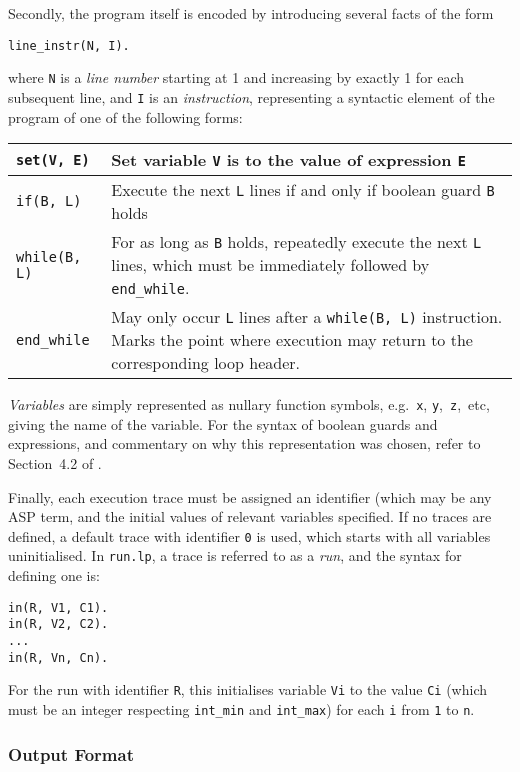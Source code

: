 \documentclass[a4paper,twoside,notitlepage,12pt]{article}
\begin{document}
Secondly, the program itself is encoded by introducing several facts of the form
\begin{verbatim}
line_instr(N, I).
\end{verbatim}
where \verb|N| is a \emph{line number} starting at 1 and increasing by exactly 1 for
each subsequent line, and \verb|I| is an \emph{instruction}, representing a syntactic
element of the program of one of the following forms:

\begin{tabularx}{\textwidth}{|l|X|}
\hline
\verb|set(V, E)| &
Set variable \verb|V| is to the value of expression \verb|E| \\
\hline
\verb|if(B, L)| &
Execute the next \verb|L| lines if and only if boolean guard \verb|B| holds \\
\hline
\verb|while(B, L)| &
For as long as \verb|B| holds, repeatedly execute the next \verb|L| lines, which must 
be immediately followed by \verb|end_while|. \\
\hline
\verb|end_while| &
May only occur \verb|L| lines after a \verb|while(B, L)| instruction. Marks the point 
where execution may return to the corresponding loop header. \\
\hline
\end{tabularx}

\emph{Variables} are simply represented as nullary function symbols, e.g.\ \verb|x|, 
\verb|y|,\ \verb|z|,\ etc, giving the name of the variable. For the syntax of boolean 
guards and expressions, and commentary on why this representation was chosen, refer to 
Section~4.2 of \cite{final}.

Finally, each execution trace must be assigned an identifier (which may be any ASP 
term, and the initial values of relevant variables specified. If no traces are defined, 
a default trace with identifier \verb|0| is used, which starts with all variables 
uninitialised. In \verb|run.lp|, a trace is referred to as a \emph{run}, and the syntax 
for defining one is:

\begin{verbatim}
in(R, V1, C1).
in(R, V2, C2).
...
in(R, Vn, Cn).
\end{verbatim}

For the run with identifier \verb|R|, this initialises variable \verb|Vi| to the value 
\verb|Ci| (which must be an integer respecting \verb|int_min| and \verb|int_max|) for 
each \verb|i| from \verb|1| to \verb|n|.

\subsubsection{Output Format}
\end{document}
